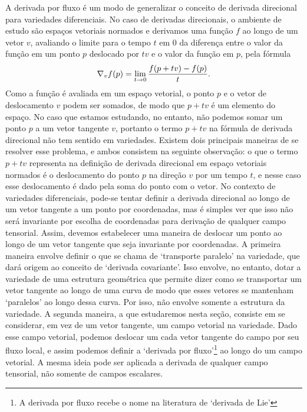 A derivada por fluxo é um modo de generalizar o conceito de derivada direcional para variedades diferenciais. No caso de derivadas direcionais, o ambiente de estudo são espaços vetoriais normados e derivamos uma função $f$ ao longo de um vetor $v$, avaliando o limite para o tempo $t$ em $0$ da diferença entre o valor da função em um ponto $p$ deslocado por $tv$ e o valor da função em $p$, pela fórmula
	\begin{equation*}
	\nabla_v f(p) = \lim_{t \rightarrow 0} \frac{f(p+tv)-f(p)}{t}.
	\end{equation*}
Como a função é avaliada em um espaço vetorial, o ponto $p$ e o vetor de deslocamento $v$ podem ser somados, de modo que $p+tv$ é um elemento do espaço. No caso que estamos estudando, no entanto, não podemos somar um ponto $p$ a um vetor tangente $v$, portanto o termo $p+tv$ na fórmula de derivada direcional não tem sentido em variedades. Existem dois principais maneiras de se resolver esse problema, e ambos consistem na seguinte observação: o que o termo $p+tv$ representa na definição de derivada direcional em espaço vetoriais normados é o deslocamento do ponto $p$ na direção $v$ por um tempo $t$, e nesse caso esse deslocamento é dado pela soma do ponto com o vetor. No contexto de variedades diferenciais, pode-se tentar definir a derivada direcional ao longo de um vetor tangente a um ponto por coordenadas, mas é simples ver que isso não será invariante por escolha de coordenadas para derivação de qualquer campo tensorial. Assim, devemos estabelecer uma maneira de deslocar um ponto ao longo de um vetor tangente que seja invariante por coordenadas. A primeira maneira envolve definir o que se chama de `transporte paralelo' na variedade, que dará origem ao conceito de `derivada covariante'. Isso envolve, no entanto, dotar a variedade de uma estrutura geométrica que permite dizer como se transportar um vetor tangente ao longo de uma curva de modo que esses vetores se mantenham `paralelos' ao longo dessa curva. Por isso, não envolve somente a estrutura da variedade. A segunda maneira, a que estudaremos nesta seção, consiste em se considerar, em vez de um vetor tangente, um campo vetorial na variedade. Dado esse campo vetorial, podemos deslocar um cada vetor tangente do campo por seu fluxo local, e assim podemos definir a `derivada por fluxo'\footnote{A derivada por fluxo recebe o nome na literatura de `derivada de Lie'} ao longo do um campo vetorial. A mesma ideia pode ser aplicada a derivada de qualquer campo tensorial, não somente de campos escalares.

